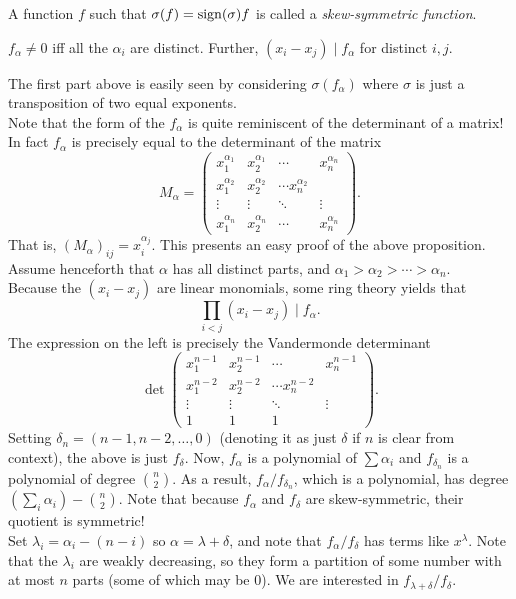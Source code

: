 	\begin{fdef}
		A function $f$ such that $\sigma(f) = \operatorname{sign}(\sigma) f$ is called a \emph{skew-symmetric function}.
	\end{fdef}

	\begin{fprop}
		$f_\alpha \ne 0$ iff all the $\alpha_i$ are distinct. Further, $(x_i - x_j) \mid f_\alpha$ for distinct $i,j$.
	\end{fprop}
	The first part above is easily seen by considering $\sigma(f_\alpha)$ where $\sigma$ is just a transposition of two equal exponents.\\

	Note that the form of the $f_\alpha$ is quite reminiscent of the determinant of a matrix! In fact $f_\alpha$ is precisely equal to the determinant of the matrix
	\[ M_\alpha = \begin{pmatrix} x_1^{\alpha_1} & x_2^{\alpha_1} & \cdots & x_n^{\alpha_n} \\ x_1^{\alpha_2} & x_2^{\alpha_2} & \cdots x_n^{\alpha_2} \\ \vdots & \vdots & \ddots & \vdots \\ x_1^{\alpha_n} & x_2^{\alpha_n} & \cdots & x_n^{\alpha_n} \end{pmatrix}. \]
	That is, $(M_\alpha)_{ij} = x_i^{\alpha_j}$. This presents an easy proof of the above proposition.\\

	Assume henceforth that $\alpha$ has all distinct parts, and $\alpha_1 > \alpha_2 > \cdots > \alpha_n$.\\
	Because the $(x_i - x_j)$ are linear monomials, some ring theory yields that
	\[ \prod_{i < j} (x_i - x_j) \mid f_\alpha. \]
	The expression on the left is precisely the Vandermonde determinant
	\[ \det \begin{pmatrix} x_1^{n-1} & x_2^{n-1} & \cdots & x_n^{n-1} \\ x_1^{n-2} & x_2^{n-2} & \cdots x_n^{n-2} \\ \vdots & \vdots & \ddots & \vdots \\ 1 & 1 & 1 \end{pmatrix}. \]
	Setting $\delta_n = (n-1,n-2,\ldots,0)$ (denoting it as just $\delta$ if $n$ is clear from context), the above is just $f_{\delta}$. Now, $f_\alpha$ is a polynomial of $\sum \alpha_i$ and $f_{\delta_n}$ is a polynomial of degree $\binom{n}{2}$. As a result, $f_\alpha/f_{\delta_n}$, which is a polynomial, has degree $\left(\sum_i \alpha_i\right) - \binom{n}{2}$. Note that because $f_\alpha$ and $f_\delta$ are skew-symmetric, their quotient is symmetric!\\
	Set $\lambda_i = \alpha_i - (n-i)$ so $\alpha = \lambda + \delta$, and note that $f_\alpha/f_\delta$ has terms like $x^\lambda$. Note that the $\lambda_i$ are weakly decreasing, so they form a partition of some number with at most $n$ parts (some of which may be $0$). We are interested in $f_{\lambda+\delta}/f_\delta$.


